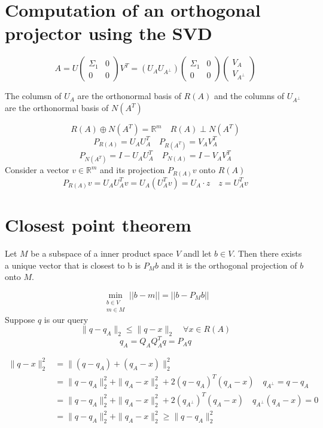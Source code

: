 \section{Computation of an orthogonal projector using the SVD}
$$
A = U\begin{pmatrix}
    \Sigma_1 & 0 \\
    0 & 0
\end{pmatrix}V^T
= (U_A U_{A^{\perp}})\begin{pmatrix}
    \Sigma_1 & 0 \\
    0 & 0
\end{pmatrix}
\begin{pmatrix}
 V_A \\
 V_{A^{\perp}}
\end{pmatrix}
$$

The columsn of $U_A$ are the orthonormal basis of $R(A)$
and the columns of $U_{A^{\perp}}$ are the orthonormal basis of $N(A^T)$

$$
R(A) \oplus N(A^T) = \mathbb{R}^m \quad R(A) \perp N(A^T)
$$ $$
P_{R(A)} = U_AU_A^T \quad P_{R(A^T)} = V_AV_A^T
$$ $$
P_{N(A^T)} = I - U_AU_A^T \quad P_{N(A)} = I - V_AV_A^T
$$
Consider a vector $v \in \mathbb{R}^m$ and its projection $P_{R(A)}v$ onto $R(A)$
$$
P_{R(A)}v = U_AU_A^Tv = U_A(U_A^Tv) = U_A \cdot z \quad z = U_A^Tv
$$

\section{Closest point theorem}
Let $M$ be a subspace of a inner product space $V$ andl let $b \in V$.
Then there exists a unique vector that is closest to b is $P_Mb$ and it is the orthogonal projection of $b$ onto $M$.

$$ \min_{\substack{b \in V \\ m \in M}} ||b - m|| = ||b - P_Mb|| $$
Suppose $q$ is our query
$$ \|q - q_A \|_2 \leq \|q - x \|_2 \quad \forall x \in R(A) $$
$$ q_A = Q_AQ_A^Tq = P_A q $$

$$
\begin{aligned}
    \|q - x \|_2^2 &= \|(q - q_A) + (q_A - x) \|_2^2 \\
    &= \|q - q_A \|_2^2 + \|q_A - x \|_2^2 + 2(q - q_A)^T(q_A - x) \quad q_{A^{\perp}} = q - q_A \\
    &= \|q - q_A \|_2^2 + \|q_A - x \|_2^2 + 2(q_{A^{\perp}})^T(q_A - x) \quad q_{A^{\perp}}(q_A - x) = 0 \\
    &= \|q - q_A \|_2^2 + \|q_A - x \|_2^2 \geq \|q - q_A \|_2^2
\end{aligned}
$$

